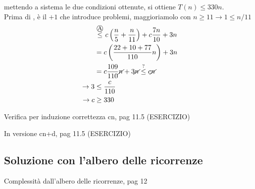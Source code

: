 \begin{description}
        mettendo a sistema le due condizioni ottenute, si ottiene $T(n) \leq 330n$.\\
        Prima di , è il $+1$ che introduce problemi, maggioriamolo con $n \geq 11 \rightarrow 1 \leq n/11$
        \begin{equation*}
            \begin{split}
                \hphantom{T(n)} &
                \overset{\mbox{\textcircled{\footnotesize A}}}{\leq} c \left( \frac{n}{5}+\frac{n}{11} \right) + c \frac{7n}{10} + 3n \\
                &=c \left( \frac{22+10+77}{110}n \right) + 3n \\
                &= c \frac{109}{110} \cancel{n}+  3\cancel{n} \overset{?}{\leq} c\cancel{n}\\
                \rightarrow 3 & \leq \frac{c}{110} \\
                \rightarrow c & \geq 330 \\
            \end{split}
        \end{equation*}
\end{description}

Verifica per induzione correttezza cn, pag 11.5 (ESERCIZIO)

In versione cn+d, pag 11.5 (ESERCIZIO)

\subsection{Soluzione con l'albero delle ricorrenze}
Complessità dall'albero delle ricorrenze, pag 12

